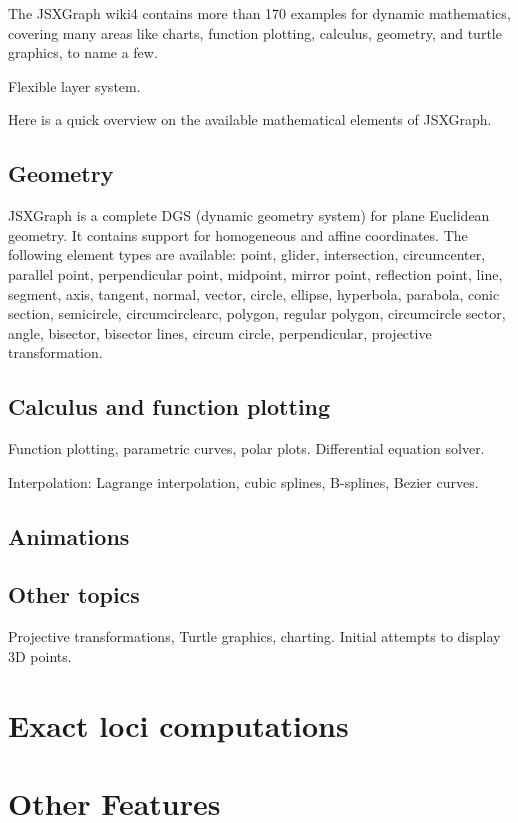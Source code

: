 \documentclass[12pt,a4paper]{article}%
\begin{document}
The JSXGraph wiki4 contains more than 170 examples for dynamic mathematics, 
covering many areas like charts, function plotting, calculus, geometry, and turtle graphics, 
to name a few.

Flexible layer system.

Here is a quick overview on the available mathematical elements of JSXGraph.

\subsection{Geometry}
JSXGraph is a complete DGS (dynamic geometry system) for plane Euclidean geometry.
It contains support for homogeneous and affine coordinates. 
The following element types are available:
point, glider, intersection, circumcenter, parallel point, perpendicular point,
midpoint, mirror point, reflection point, 
line, segment, axis, tangent, normal, vector,
circle, ellipse, hyperbola, parabola, conic section,
semicircle, circumcirclearc, polygon, regular polygon, circumcircle sector,
angle, bisector, bisector lines, circum circle, perpendicular,
projective transformation.

\subsection{Calculus and function plotting}
Function plotting, parametric curves, polar plots. 
Differential equation solver.

Interpolation: Lagrange interpolation, 
cubic splines, B-splines, Bezier curves.

\subsection{Animations}


\subsection{Other topics}
Projective transformations,
Turtle graphics, 
charting.
Initial attempts to display 3D points.

\section{Exact loci computations}

\section{Other Features}
\end{document}
